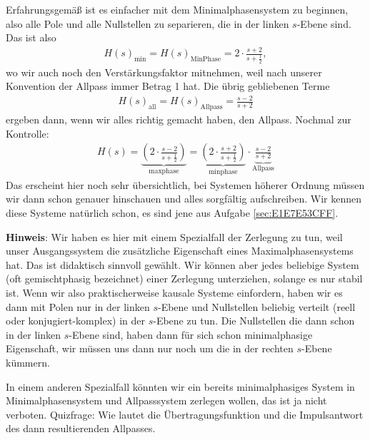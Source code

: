 \begin{ExCalc}
Erfahrungsgemäß ist es einfacher mit dem Minimalphasensystem zu beginnen, also
alle Pole und alle Nullstellen zu separieren, die in der linken $s$-Ebene sind.
Das ist also
\begin{align}
H(s)_\mathrm{min}  = H(s)_\mathrm{Min Phase} = 2\cdot\frac{s+2}{s+\frac{1}{2}},
\end{align}
wo wir auch noch den Verstärkungsfaktor mitnehmen, weil nach unserer Konvention
der Allpass immer Betrag 1 hat.
Die übrig gebliebenen Terme
\begin{align}
H(s)_\mathrm{all}  = H(s)_\mathrm{Allpass} =  \frac{s-2}{s+2}
\end{align}
ergeben dann, wenn wir alles richtig gemacht haben, den Allpass.
Nochmal zur Kontrolle:
\begin{align}
H(s) =
\underbrace{\left(2\cdot\frac{s-2}{s+\frac{1}{2}}\right)}_{\mathrm{max phase}} =
\underbrace{\left(2\cdot\frac{s+2}{s+\frac{1}{2}}\right)}_{\mathrm{min phase}}
\cdot \underbrace{\frac{s-2}{s+2}}_{\mathrm{Allpass}}
\end{align}
Das erscheint hier noch sehr übersichtlich, bei Systemen höherer Ordnung
müssen wir dann schon genauer hinschauen und alles sorgfältig aufschreiben.
%
Wir kennen diese Systeme natürlich schon, es sind jene aus Aufgabe \ref{sec:E1E7E53CFF}.

\textbf{Hinweis}: Wir haben es hier mit einem Spezialfall der Zerlegung zu tun,
weil unser Ausgangssystem die zusätzliche Eigenschaft eines Maximalphasensystems
hat. Das ist didaktisch sinnvoll gewählt.
Wir können aber jedes beliebige System (oft gemischtphasig bezeichnet) einer
Zerlegung unterziehen, solange es nur stabil ist. Wenn wir also praktischerweise
kausale Systeme einfordern, haben wir es dann mit Polen nur in der linken $s$-Ebene
und Nullstellen beliebig verteilt (reell oder konjugiert-komplex)
in der $s$-Ebene zu tun.
Die Nullstellen die dann schon in der linken $s$-Ebene sind, haben
dann für sich schon minimalphasige Eigenschaft, wir müssen uns dann nur noch
um die in der rechten $s$-Ebene kümmern.

In einem anderen Spezialfall
könnten wir ein bereits minimalphasiges System in Minimalphasensystem und
Allpasssystem zerlegen wollen, das ist ja nicht verboten.
Quizfrage: Wie lautet die Übertragungsfunktion und die Impulsantwort des dann
resultierenden Allpasses.

\end{ExCalc}



